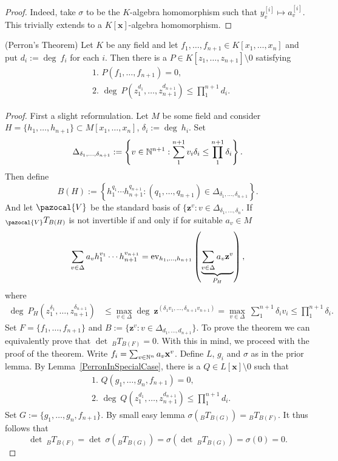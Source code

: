     \begin{proof}
        Indeed, take $\sigma$ to be the $K$-algebra homomorphism such that $y_v^{[i]}\mapsto a_v^{[i]}$. This trivially extends to a $K[\mathbf{x}]$-algebra homomorphism. 
    \end{proof}
    \begin{theorem}(Perron's Theorem) Let $K$ be any field and let $f_1,\dots,f_{n+1}\in K[x_1,\dots,x_{n}]$ and put $d_i := \deg \ f_i$ for each $i$. Then there is a $P\in K[z_1,\dots,z_{n+1}]\setminus 0$ satisfying 
    \begin{align*}
        &\text{1. } P(f_1,\dots,f_{n+1}) = 0,\\
        &\text{2. } \deg \ P(z_1^{d_1},\dots,z_{n+1}^{d_{n+1}}) \leq \prod_1^{n+1} d_i.
    \end{align*}
    \end{theorem}
    \begin{proof}
        First a slight reformulation. Let $M$ be some field and consider $H=\{h_1,\dots,h_{n+1}\} \subset M[x_1,\dots,x_n]$, $\delta_i:=\deg\ h_i$. Set $$\Delta_{\delta_1,\dots,\delta_{n+1}}:=\left\{ v\in \mathbb{N}^{n+1} : \sum_1^{n+1} v_i\delta_i \leq \prod_1^{n+1} \delta_i\right\}.$$
        Then define 
        $$B(H) := \left\{ h_1^{q_1}\cdots h_{n+1}^{q_{n+1}} : (q_1,\dots,q_{n+1})\in \Delta_{\delta_1,\dots,\delta_{n+1}}\right\}.$$
        And let $\pazocal{V}$ be the standard basis of $\{\mathbf{z}^v : v\in \Delta_{\delta_1,\dots,\delta_n}$. If $_\pazocal{V}T_{B(H)}$ is not invertible if and only if for suitable $a_v\in M$
        $$\sum_{v\in \Delta } a_vh_1^{v_1}\cdots h_{n+1}^{v_{n+1}} = \mathrm{ev}_{h_1,\dots,h_{n+1}}\left(\underbrace{\sum_{v\in\Delta} a_v\mathbf{z}^v}_{P_H}\right),$$
        where 
        \begin{align*}
        \deg \ P_H(z_1^{\delta_1},\dots,z_{n+1}^{\delta_{n+1}}) &\leq \max_{v\in \Delta} \deg \ \mathbf{z}^{(\delta_1v_1,\dots,\delta_{n+1}v_{n+1})} = \max_{v\in\Delta}\ \sum_1^{n+1} \delta_iv_i \leq \prod_1^{n+1}\delta_i.
        \end{align*}
        Set $F=\{f_1,\dots,f_{n+1}\}$ and $B := \{\mathbf{z}^v : v\in \Delta_{d_1,\dots,d_{n+1}}\}$. To prove the theorem we can equivalently prove that $\det \ _BT_{B(F)}=0$. With this in mind, we proceed with the proof of the theorem. Write $f_i = \sum_{v\in\mathbb{N}^n} a_v\mathbf{x}^v$. Define $L$, $g_i$ and $\sigma$ as in the prior lemma. By Lemma~\ref{PerronInSpecialCase}, there is a $Q\in L[\mathbf{x}]\setminus 0$ such that 
        \begin{align*}
            &\text{1. } Q(g_1,\dots,g_n,f_{n+1}) =0,\\
            &\text{2. } \deg \ Q(z_1^{d_1},\dots,z_{n+1}^{d_{n+1}}) \leq \prod_1^{n+1} d_i.
        \end{align*}
        Set $G := \{g_1,\dots,g_n,f_{n+1}\}$. By {\Large small easy lemma} $\sigma(_BT_{B(G)}) = {_B}T_{B(F)}$. It thus follows that 
        $$\det \ {_B}T_{B(F)} = \det \ \sigma(_BT_{B(G)}) = \sigma(\det\ _BT_{B(G)})= \sigma(0)=0.$$ 
    \end{proof}
